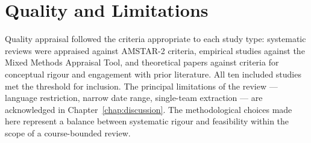 \section{Quality and Limitations}

Quality appraisal followed the criteria appropriate to each study type: systematic reviews were appraised against AMSTAR-2 criteria, empirical studies against the Mixed Methods Appraisal Tool, and theoretical papers against criteria for conceptual rigour and engagement with prior literature. All ten included studies met the threshold for inclusion. The principal limitations of the review --- language restriction, narrow date range, single-team extraction --- are acknowledged in Chapter~\ref{chap:discussion}. The methodological choices made here represent a balance between systematic rigour and feasibility within the scope of a course-bounded review.
